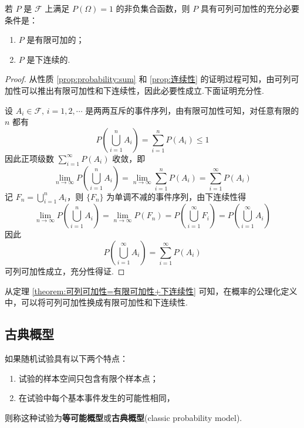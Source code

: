 \begin{theorem}[][][theorem:可列可加性=有限可加性+下连续性]
    \indent 若 $P$ 是 $\mathcal{F}$ 上满足 $P(\varOmega) = 1$ 的非负集合函数，则 $P$ 具有可列可加性的充分必要条件是：
    \begin{enumerate}
        \item $P$ 是有限可加的；
        \item $P$ 是下连续的.
    \end{enumerate}
\end{theorem}

\begin{proof}
    从性质 \ref{prop:probability:sum} 和 \ref{prop:连续性} 的证明过程可知，由可列可加性可以推出有限可加性和下连续性，因此必要性成立.下面证明充分性.

    设 $A_i \in \mathcal{F}, \, i=1,2,\cdots$ 是两两互斥的事件序列，由有限可加性可知，对任意有限的 $n$ 都有
    $$
    P \left( \bigcup_{i=1}^n A_i \right) = \sum_{i=1}^n P(A_i) \leqslant 1
    $$
    因此正项级数 $\displaystyle\sum_{i=1}^{\infty} P(A_i)$ 收敛，即
    $$
    \lim_{n \to \infty} P \left( \bigcup_{i=1}^n A_i \right) = \lim_{n \to \infty} \sum_{i=1}^n P(A_i) = \sum_{i=1}^{\infty} P(A_i)
    $$
    记 $F_n = \displaystyle\bigcup_{i=1}^n A_i$，则 $\{ F_n \}$ 为单调不减的事件序列，由下连续性得
    $$
    \lim_{n \to \infty} P \left( \bigcup_{i=1}^n A_i \right) = \lim_{n \to \infty} P(F_n) = P \left(  \bigcup_{i=1}^{\infty} F_i \right) = P \left( \bigcup_{i=1}^{\infty} A_i \right)
    $$
    因此
    $$
    P \left( \bigcup_{i=1}^{\infty} A_i \right) = \sum_{i=1}^{\infty} P(A_i)
    $$
    可列可加性成立，充分性得证.
\end{proof}

\begin{note}
    \indent 从定理 \ref{theorem:可列可加性=有限可加性+下连续性} 可知，在概率的公理化定义中，可以将可列可加性换成有限可加性和下连续性.
\end{note}

\subsection{古典概型}

如果随机试验具有以下两个特点：
\begin{enumerate}
    \item 试验的样本空间只包含有限个样本点；
    \item 在试验中每个基本事件发生的可能性相同，
\end{enumerate}
则称这种试验为\textbf{等可能概型}或\textbf{古典概型}(classic probability model).


